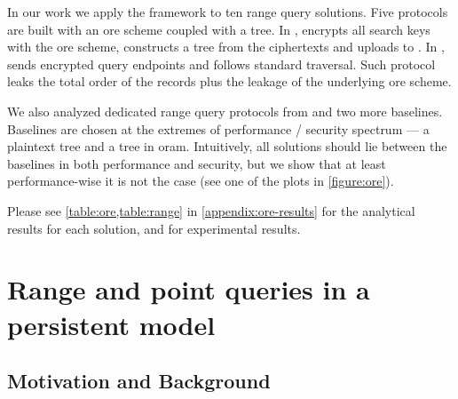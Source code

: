 			In our work we apply the framework to ten range query solutions.
			Five protocols are built with an \acrfull{ore} scheme coupled with a \BPlus{} tree.
			In \protocolSetup{}, \client{} encrypts all search keys with the \acrshort{ore} scheme, constructs a \BPlus{} tree from the ciphertexts and uploads to \server{}.
			In \protocolQuery{}, \client{} sends encrypted query endpoints and \server{} follows standard \BPlus{} traversal.
			Such protocol leaks the total order of the records plus the leakage of the underlying \acrshort{ore} scheme.

			We also analyzed dedicated range query protocols from \cite{florian-protocol,pope,practical-range-search} and two more baselines.
			Baselines are chosen at the extremes of performance / security spectrum --- a plaintext \BPlus{} tree and a \BPlus{} tree in \acrshort{oram}.
			Intuitively, all solutions should lie between the baselines in both performance and security, but we show that at least performance-wise it is not the case (see one of the plots in \cref{figure:ore}).

			Please see \cref{table:ore,table:range} in \cref{appendix:ore-results} for the analytical results for each solution, and \cite{ore-benchmark-17} for experimental results.

			

	\section{Range and point queries in a persistent model}\label{section:range-queries-persistent}

		\subsection{Motivation and Background}

